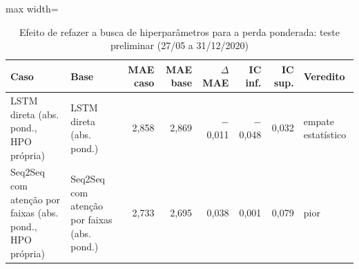 \begin{table}[!htbp]
    \centering
    \caption{Efeito de refazer a busca de hiperparâmetros para a perda ponderada: teste preliminar (27/05 a 31/12/2020)}
    \label{tab:verificacao_hpo_teste_historico}
    \small
    \begin{adjustbox}{max width=\textwidth}
    \begin{tabular}{>{\raggedright\arraybackslash}p{}lrrrrrl}
        \toprule
        Caso & Base & MAE caso & MAE base & $\Delta$ MAE & IC inf. & IC sup. & Veredito \\
        \midrule
        LSTM direta (abs. pond., HPO própria) & LSTM direta (abs. pond.) & 2,858 & 2,869 & $-$0,011 & $-$0,048 & 0,032 & empate estatístico \\
        Seq2Seq com atenção por faixas (abs. pond., HPO própria) & Seq2Seq com atenção por faixas (abs. pond.) & 2,733 & 2,695 & 0,038 & 0,001 & 0,079 & pior \\
        \bottomrule
    \end{tabular}
    \end{adjustbox}
\end{table}
